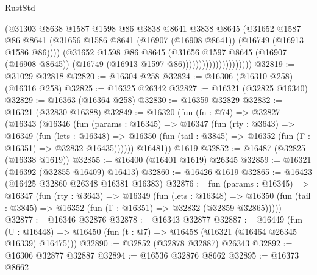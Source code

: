 \begin{lexlean}{RustStd}
\begin{coremodule}
                                    (@31303
                                      @8638
                                      @1587
                                      @1598
                                      @86
                                      @3838
                                      @8641
                                      @3838
                                      @8645
                                      (@31652
                                        @1587
                                        @86
                                        @8641
                                        (@31656
                                          @1586
                                          @8641
                                          (@16907 (@16908 @8641))
                                          (@16749 (@16913 @1586 @86))))
                                      (@31652
                                        @1598
                                        @86
                                        @8645
                                        (@31656
                                          @1597
                                          @8645
                                          (@16907 (@16908 @8645))
                                          (@16749 (@16913 @1597 @86)))))))))))))))))))))
@32819 := @31029 @32818
@32820 := @16304 @258
@32824 := @16306 (@16310 @258) (@16316 @258)
@32825 := @16325 @26342
@32827 := @16321 (@32825 @16340)
@32829 := @16363 (@16364 @258)
@32830 := @16359 @32829
@32832 := @16321 (@32830 @16388)
@32849 := @16320
    (fun (fn : @74) =>
    @32827
      (@16343
        (@16346
          (fun (params : @16345) =>
          @16347
            (fun (rty : @3643) =>
            @16349
              (fun (lets : @16348) =>
              @16350 (fun (tail : @3845) => @16352 (fun (Γ : @16351) => @32832 @16435))))))
        @16481))
    @1619
@32852 := @16487 (@32825 (@16338 @1619))
@32855 := @16400 (@16401 @1619) @26345
@32859 := @16321 (@16392 (@32855 @16409) @16413)
@32860 := @16426 @1619
@32865 := @16423 (@16425 @32860 @26348 @16381 @16383)
@32876 := fun (params : @16345) =>
  @16347
    (fun (rty : @3643) =>
    @16349
      (fun (lets : @16348) =>
      @16350 (fun (tail : @3845) => @16352 (fun (Γ : @16351) => @32832 (@32859 @32865)))))
@32877 := @16346 @32876
@32878 := @16343 @32877
@32887 := @16449
    (fun (U : @16448) => @16450 (fun (t : @7) => @16458 (@16321 (@16464 @26345 @16339) @16475)))
@32890 := @32852 (@32878 @32887) @26343
@32892 := @16306 @32877 @32887
@32894 := @16536 @32876 @8662
@32895 := @16373 @8662

\end{coremodule}
\end{lexlean}
